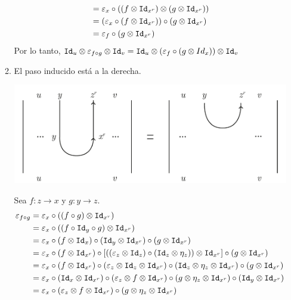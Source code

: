\documentclass[../main.tex]{subfiles}
\begin{document}
\begin{enumerate}
\begin{enumerate}
\begin{align*}
                &= \varepsilon_x \circ ((f \otimes \texttt{Id}_{x^r}) \otimes (g \otimes \texttt{Id}_{x^r})) \\
                &= (\varepsilon_x \circ (f \otimes \texttt{Id}_{x^r})) \circ (g \otimes \texttt{Id}_{x^r}) \\
                &= \varepsilon_f \circ (g \otimes \texttt{Id}_{x^r})
            \end{align*}
            Por lo tanto, $\texttt{Id}_u \otimes \varepsilon_{f \circ g} \otimes \texttt{Id}_v = \texttt{Id}_u \otimes (\varepsilon_f \circ (g \otimes Id_x)) \otimes \texttt{Id}_v$
            \item El paso inducido está a la derecha. 
            \begin{center} \includegraphics[scale=.2]{TeX/diagrama/5-11.pdf}
            \end{center}
            Sea $f:z \to x$ y $g: y \to z$. 
            \begin{align*}
                \varepsilon_{f \circ g} &= \varepsilon_x \circ ((f \circ g) \otimes \id_{x^r}) \\
                &= \varepsilon_x \circ ((f \circ \id_y \circ g) \otimes \id_{x^r}) \\
                &= \varepsilon_x \circ (f \otimes \id_x) \circ (\id_y \otimes \id_{x^r}) \circ (g \otimes \id_{x^r}) \\
                &= \varepsilon_x \circ (f \otimes \id_{x^r}) \circ [((\varepsilon_z \otimes \id_z) \circ (\id_z \otimes \eta_z) ) \otimes \id_{x^r}] \circ (g \otimes \id_{x^r}) \\
                &= \varepsilon_x \circ (f \otimes \id_{x^r}) \circ (\varepsilon_z \otimes \id_z \otimes \id_{x^r}) \circ (\id_z \otimes \eta_z \otimes \id_{x^r}) \circ (g \otimes \id_{x^r}) \\
                &= \varepsilon_x \circ (\id_x \otimes \id_{x^r}) \circ (\varepsilon_z \otimes f \otimes \id_{x^r}) \circ (g \otimes \eta_z \otimes \id_{x^r}) \circ (\id_y \otimes \id_{x^r}) \\
                &=\varepsilon_x \circ (\varepsilon_z \otimes f \otimes \id_{x^r}) \circ (g \otimes \eta_z \otimes \id_{x^r}) \\

\end{align*}
\end{enumerate}
\end{enumerate}
\end{document}
